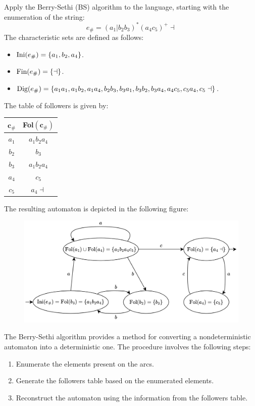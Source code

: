 \begin{example}
    Apply the Berry-Sethi (BS) algorithm to the language, starting with the enumeration of the string:
    \[e_{\#}=(a_1|b_2b_3)^{*}(a_4c_5)^{+} \dashv\]
    The characteristic sets are defined as follows:
    \begin{itemize}
        \item $\textnormal{Ini}(e_{\#})=\{a_1,b_2,a_4\}$.
        \item $\textnormal{Fin}(e_{\#})=\{\dashv\}$.
        \item $\textnormal{Dig}(e_{\#})=\{a_1a_1,a_1b_2,a_1a_4,b_2b_3,b_3a_1,b_3b_2,b_3a_4,a_4c_5,c_5a_4,c_5\dashv\}$.
    \end{itemize}
    The table of followers is given by:
    \begin{table}[H]
        \centering
        \begin{tabular}{cc}
        \hline
        \textbf{$\boldsymbol{c_{\#}}$} & \textbf{Fol$(\boldsymbol{c_{\#}})$} \\ \hline
        $a_1$                          & $a_1b_2a_4$                         \\
        $b_2$                          & $b_3$                               \\
        $b_3$                          & $a_1b_2a_4$                         \\
        $a_4$                          & $c_5$                               \\
        $c_5$                          & $a_4\dashv$                         \\ \hline
        \end{tabular}
    \end{table}
    The resulting automaton is depicted in the following figure:
    \begin{figure}[H]
        \centering
        \includegraphics[width=0.7\linewidth]{images/bs.png}
    \end{figure}
\end{example}
The Berry-Sethi algorithm provides a method for converting a nondeterministic automaton into a deterministic one. 
The procedure involves the following steps:
\begin{enumerate}
    \item Enumerate the elements present on the arcs.
    \item Generate the followers table based on the enumerated elements.
    \item Reconstruct the automaton using the information from the followers table.
\end{enumerate}

